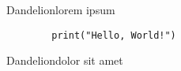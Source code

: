 \documentclass{article}
\begin{document}

\begin{large}

\begin{boxpar}{Dandelion}{lorem ipsum}
    \begin{verbatim}
        print("Hello, World!")
    \end{verbatim}
\end{boxpar}

\begin{boxpar}{Dandelion}{dolor sit amet}
    \lipsum[4]
\end{boxpar}

\end{large}
\end{document}
